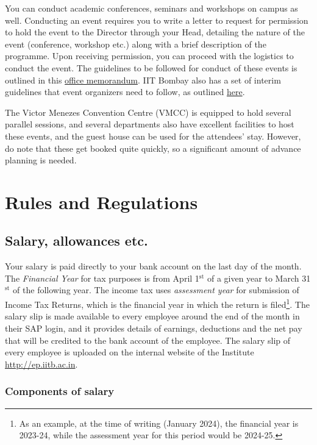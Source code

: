 \documentclass[
  10pt,
  a5paper,
  10pt,
  openany]{amsbook}
\begin{document}
You can conduct academic conferences, seminars and workshops on campus
as well. Conducting an event requires you to write a letter to request
for permission to hold the event to the Director through your Head,
detailing the nature of the event (conference, workshop etc.) along with
a brief description of the programme. Upon receiving permission, you can
proceed with the logistics to conduct the event. The guidelines to be
followed for conduct of these events is outlined in this
\href{https://doe.gov.in/sites/default/files/Conference_OM_30\%20May\%202018.pdf}{office
memorandum}. IIT Bombay also has a set of interim guidelines that event
organizers need to follow, as outlined
\href{https://bighome.iitb.ac.in/index.php/s/97fxp88wZLJDHfF}{here}.

The Victor Menezes Convention Centre (VMCC) is equipped to hold several
parallel sessions, and several departments also have excellent
facilities to host these events, and the guest house can be used for the
attendees' stay. However, do note that these get booked quite quickly,
so a significant amount of advance planning is needed.

\part{Rules and Regulations}

\chapter{Salary, allowances etc.}\label{salary-allowances-etc.}

Your salary is paid directly to your bank account on the last day of the
month. The \emph{Financial Year} for tax purposes is from April
1\(^{\text{st}}\) of a given year to March 31\(^{\text{st}}\) of the
following year. The income tax uses \emph{assessment year} for
submission of Income Tax Returns, which is the financial year in which
the return is filed\footnote{As an example, at the time of writing
  (January 2024), the financial year is 2023-24, while the assessment
  year for this period would be 2024-25.}. The salary slip is made
available to every employee around the end of the month in their SAP
login, and it provides details of earnings, deductions and the net pay
that will be credited to the bank account of the employee. The salary
slip of every employee is uploaded on the internal website of the
Institute \url{http://ep.iitb.ac.in}.

\section{Components of salary}\label{components-of-salary}
\end{document}
